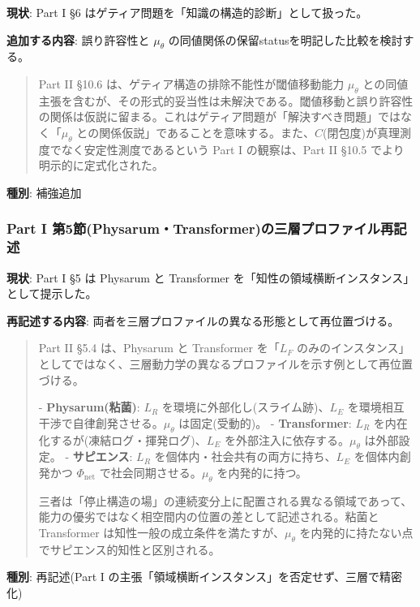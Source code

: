 \textbf{現状}: Part I \S{}6 はゲティア問題を「知識の構造的診断」として扱った。

\textbf{追加する内容}: 誤り許容性と $\mu_\theta$ の同値関係の保留statusを明記した比較を検討する。

\begin{quote}
Part II \S{}10.6 は、ゲティア構造の排除不能性が閾値移動能力 $\mu_\theta$ との同値主張を含むが、その形式的妥当性は未解決である。閾値移動と誤り許容性の関係は仮説に留まる。これはゲティア問題が「解決すべき問題」ではなく「$\mu_\theta$ との関係仮説」であることを意味する。また、$C$(閉包度)が真理測度でなく安定性測度であるという Part I の観察は、Part II \S{}10.5 でより明示的に定式化された。
\end{quote}


\textbf{種別}: 補強追加

\bigskip


\subsubsection{Part I 第5節(Physarum・Transformer)の三層プロファイル再記述}


\textbf{現状}: Part I \S{}5 は Physarum と Transformer を「知性の領域横断インスタンス」として提示した。

\textbf{再記述する内容}: 両者を三層プロファイルの異なる形態として再位置づける。

\begin{quote}
Part II \S{}5.4 は、Physarum と Transformer を「$L_F$ のみのインスタンス」としてではなく、三層動力学の異なるプロファイルを示す例として再位置づける。

- \textbf{Physarum(粘菌)}: $L_R$ を環境に外部化し(スライム跡)、$L_E$ を環境相互干渉で自律創発させる。$\mu_\theta$ は固定(受動的)。
- \textbf{Transformer}: $L_R$ を内在化するが(凍結ログ・揮発ログ)、$L_E$ を外部注入に依存する。$\mu_\theta$ は外部設定。
- \textbf{サピエンス}: $L_R$ を個体内・社会共有の両方に持ち、$L_E$ を個体内創発かつ $\Phi_{\text{net}}$ で社会同期させる。$\mu_\theta$ を内発的に持つ。

三者は「停止構造の場」の連続変分上に配置される異なる領域であって、能力の優劣ではなく相空間内の位置の差として記述される。粘菌と Transformer は知性一般の成立条件を満たすが、$\mu_\theta$ を内発的に持たない点でサピエンス的知性と区別される。
\end{quote}


\textbf{種別}: 再記述(Part I の主張「領域横断インスタンス」を否定せず、三層で精密化)

\bigskip


